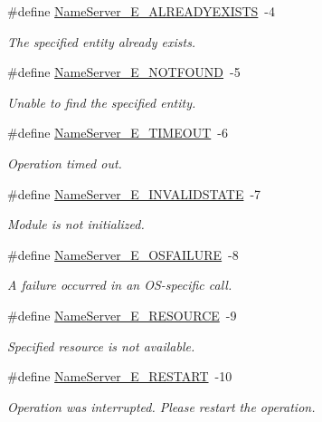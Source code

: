 \begin{DoxyCompactItemize}
\#define \hyperlink{_name_server_8h_ac52dae450ec3de45caa3ce1fe143b46e}{NameServer\_\-E\_\-ALREADYEXISTS}~-\/4
\begin{DoxyCompactList}\small\item\em The specified entity already exists. \item\end{DoxyCompactList}\item 
\#define \hyperlink{_name_server_8h_a6af9a47d256473dbeb9653988603c36e}{NameServer\_\-E\_\-NOTFOUND}~-\/5
\begin{DoxyCompactList}\small\item\em Unable to find the specified entity. \item\end{DoxyCompactList}\item 
\#define \hyperlink{_name_server_8h_a0f8f1fb04f719120e127565d2c3aaa5c}{NameServer\_\-E\_\-TIMEOUT}~-\/6
\begin{DoxyCompactList}\small\item\em Operation timed out. \item\end{DoxyCompactList}\item 
\#define \hyperlink{_name_server_8h_af8382f12ca225820d75eee0b5b48f57f}{NameServer\_\-E\_\-INVALIDSTATE}~-\/7
\begin{DoxyCompactList}\small\item\em Module is not initialized. \item\end{DoxyCompactList}\item 
\#define \hyperlink{_name_server_8h_a1241686307312899fadce59ec251b237}{NameServer\_\-E\_\-OSFAILURE}~-\/8
\begin{DoxyCompactList}\small\item\em A failure occurred in an OS-\/specific call. \item\end{DoxyCompactList}\item 
\#define \hyperlink{_name_server_8h_afb9e082dbbf79808eb895db9b818e126}{NameServer\_\-E\_\-RESOURCE}~-\/9
\begin{DoxyCompactList}\small\item\em Specified resource is not available. \item\end{DoxyCompactList}\item 
\#define \hyperlink{_name_server_8h_acf390d38dd50b5ea5f4d58c6e892d8b6}{NameServer\_\-E\_\-RESTART}~-\/10
\begin{DoxyCompactList}\small\item\em Operation was interrupted. Please restart the operation. \item\end{DoxyCompactList}\item 

\end{DoxyCompactItemize}
